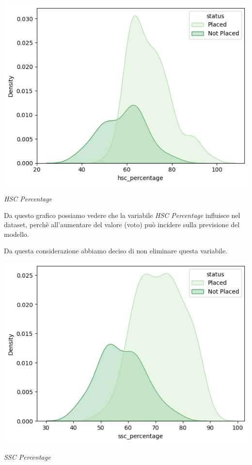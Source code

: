 \documentclass[12pt]{article}
\begin{document}
\begin{center}
    \includegraphics[scale=0.5]{hscpercentage.png}

    \textit{HSC Percentage}
\end{center}

Da questo grafico possiamo vedere che la variabile \textit{HSC Percentage} influisce nel dataset, perchè all'aumentare del valore (voto)
può incidere sulla previsione del modello.

Da questa considerazione abbiamo deciso di non eliminare questa variabile.

\begin{center}
    \includegraphics[scale=0.5]{sscpercentage.png}

    \textit{SSC Percentage}
\end{center}
\end{document}
